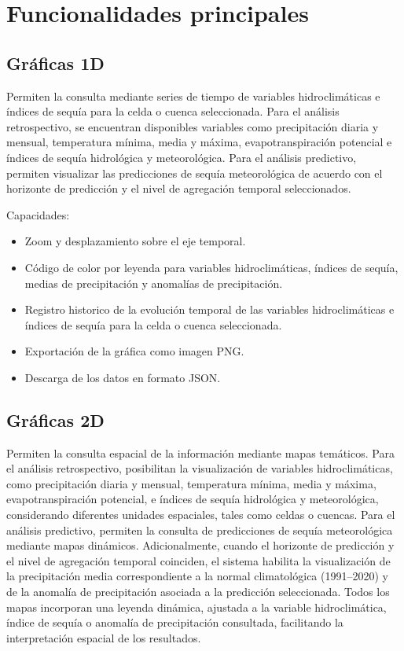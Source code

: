 \section{Funcionalidades principales}
\label{sec:funcionalidades}

\subsection{Gráficas 1D}
\label{subsec:graficas1d}

Permiten la consulta mediante series de tiempo de variables hidroclimáticas e índices de sequía para la celda o cuenca seleccionada. Para el análisis retrospectivo, se encuentran disponibles variables como precipitación diaria y mensual, temperatura mínima, media y máxima, evapotranspiración potencial e índices de sequía hidrológica y meteorológica. Para el análisis predictivo, permiten visualizar las predicciones de sequía meteorológica de acuerdo con el horizonte de predicción y el nivel de agregación temporal seleccionados.

Capacidades:
\begin{itemize}
    \item Zoom y desplazamiento sobre el eje temporal.
    \item Código de color por leyenda para variables hidroclimáticas, índices de sequía, medias de precipitación y anomalías de precipitación.
    \item Registro historico de la evolución temporal de las variables hidroclimáticas e índices de sequía para la celda o cuenca seleccionada.
    \item Exportación de la gráfica como imagen PNG.
    \item Descarga de los datos en formato JSON.
\end{itemize}

\subsection{Gráficas 2D}
\label{subsec:graficas2d}

Permiten la consulta espacial de la información mediante mapas temáticos. Para el análisis retrospectivo, posibilitan la visualización de variables hidroclimáticas, como precipitación diaria y mensual, temperatura mínima, media y máxima, evapotranspiración potencial, e índices de sequía hidrológica y meteorológica, considerando diferentes unidades espaciales, tales como celdas o cuencas. Para el análisis predictivo, permiten la consulta de predicciones de sequía meteorológica mediante mapas dinámicos. Adicionalmente, cuando el horizonte de predicción y el nivel de agregación temporal coinciden, el sistema habilita la visualización de la precipitación media correspondiente a la normal climatológica (1991–2020) y de la anomalía de precipitación asociada a la predicción seleccionada. Todos los mapas incorporan una leyenda dinámica, ajustada a la variable hidroclimática, índice de sequía o anomalía de precipitación consultada, facilitando la interpretación espacial de los resultados.

